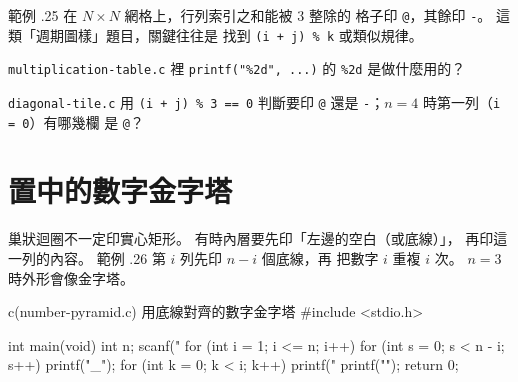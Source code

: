
範例 \thechapter.25 在 $N \times N$ 網格上，行列索引之和能被 $3$ 整除的
格子印 \texttt{@}，其餘印 \texttt{-}。 這類「週期圖樣」題目，關鍵往往是
找到 \texttt{(i + j) \% k} 或類似規律。



\begin{drills}[label=drills:loop-mult-table]
\item \texttt{multiplication-table.c} 裡 \texttt{printf("\%2d", ...)}
的 \texttt{\%2d} 是做什麼用的？
\item \texttt{diagonal-tile.c} 用 \texttt{(i + j) \% 3 == 0} 判斷要印
\texttt{@} 還是 \texttt{-}；$n = 4$ 時第一列（\texttt{i = 0}）有哪幾欄
是 \texttt{@}？
\end{drills}

\section{置中的數字金字塔}
\label{sec:loop-pyramid}

巢狀迴圈不一定印實心矩形。 有時內層要先印「左邊的空白（或底線）」，
再印這一列的內容。 範例 \thechapter.26 第 $i$ 列先印 $n-i$ 個底線，再
把數字 $i$ 重複 $i$ 次。 $n = 3$ 時外形會像金字塔。

\begin{example}{c}{(number-pyramid.c) 用底線對齊的數字金字塔}
#include <stdio.h>

int main(void) {
    int n;
    scanf("%
    for (int i = 1; i <= n; i++) {
        for (int s = 0; s < n - i; s++) {
            printf("_");
        }
        for (int k = 0; k < i; k++) {
            printf("%
        }
        printf("\n");
    }
    return 0;
}
\end{example}

